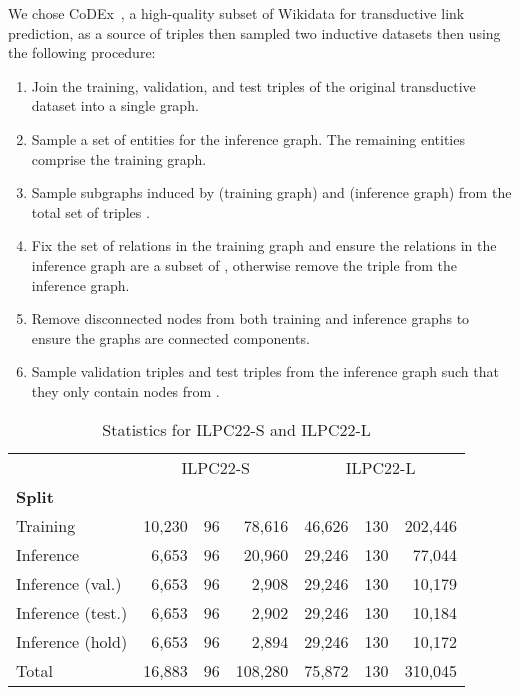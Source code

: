 \documentclass[sigconf,screen]{acmart}
\begin{document}
We chose CoDEx~\cite{safavi2020}, a high-quality subset of Wikidata for transductive link prediction, as a source of triples then sampled two inductive datasets then using the following procedure:
\begin{enumerate}
    \item Join the training, validation, and test triples of the original transductive dataset into a single graph.
    \item Sample a set of entities  for the inference graph. The remaining entities  comprise the training graph.
    \item Sample subgraphs induced by  (training graph) and  (inference graph) from the total set of triples .
    \item Fix the set of relations  in the training graph and ensure the relations in the inference graph are a subset of , otherwise remove the triple from the inference graph.
    \item Remove disconnected nodes from both training and inference graphs to ensure the graphs are connected components.
    \item Sample validation triples  and test triples  from the inference graph  such that they only contain nodes from . \end{enumerate}


\begin{table}[]
    \centering
    \begin{tabular}{lrrr|rrr}
        \toprule
         & \multicolumn{3}{c}{ILPC22-S} & \multicolumn{3}{c}{ILPC22-L} \\
         \textbf{Split} &  &  &  &  &  & \\
         \midrule
         Training          & 10,230  & 96 & 78,616 & 46,626  & 130 & 202,446\\
         Inference         &  6,653  & 96 & 20,960 & 29,246  & 130 &  77,044\\
         Inference (val.)  &  6,653  & 96 &  2,908 & 29,246  & 130 &  10,179\\
         Inference (test.) &  6,653  & 96 &  2,902 & 29,246  & 130 &  10,184\\
         Inference (hold)  &  6,653  & 96 &  2,894 & 29,246  & 130 &  10,172\\
         \midrule
         Total & 16,883 & 96 & 108,280 & 75,872 & 130 & 310,045 \\
         \bottomrule
    \end{tabular}
    \caption{Statistics for ILPC22-S and ILPC22-L}
    \label{tab:dataset-statistics}
\end{table}
\end{document}
